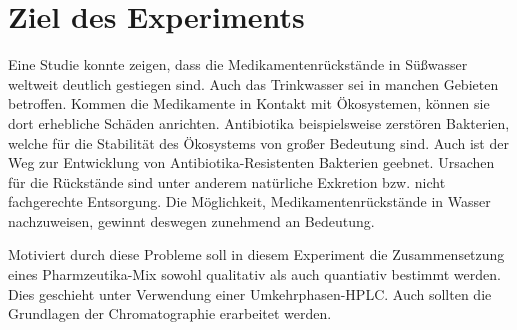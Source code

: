\section{Ziel des Experiments}
  
  Eine Studie konnte zeigen, dass die Medikamentenrückstände in Süßwasser weltweit deutlich gestiegen sind. Auch das Trinkwasser sei in manchen Gebieten betroffen. Kommen die Medikamente in Kontakt mit Ökosystemen, können sie dort erhebliche Schäden anrichten. Antibiotika beispielsweise zerstören Bakterien, welche für die Stabilität des Ökosystems von großer Bedeutung sind. Auch ist der Weg zur Entwicklung von Antibiotika-Resistenten Bakterien geebnet. \citep{MedicamentsORF} Ursachen für die Rückstände sind unter anderem natürliche Exkretion bzw. nicht fachgerechte Entsorgung. \citep{Versuchsvorschrift} Die Möglichkeit, Medikamentenrückstände in Wasser nachzuweisen, gewinnt deswegen zunehmend an Bedeutung.
  
  Motiviert durch diese Probleme soll in diesem Experiment die Zusammensetzung eines Pharmzeutika-Mix sowohl qualitativ als auch quantiativ bestimmt werden. Dies geschieht unter Verwendung einer Umkehrphasen-HPLC. Auch sollten die Grundlagen der Chromatographie erarbeitet werden. 